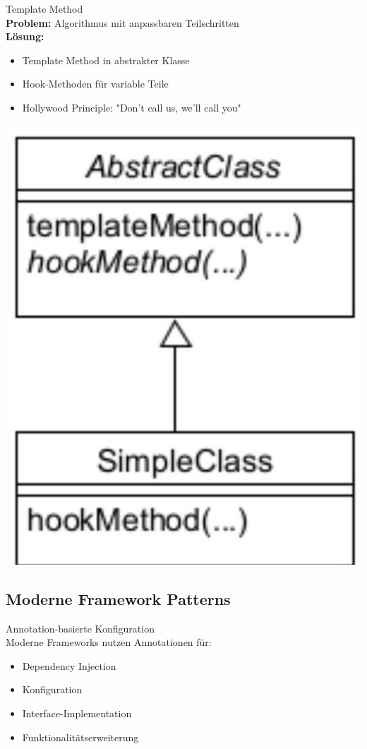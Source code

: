 \begin{concept}{Template Method}\\
\textbf{Problem:} Algorithmus mit anpassbaren Teilschritten\\
\textbf{Lösung:}
\begin{itemize}
    \item Template Method in abstrakter Klasse
    \item Hook-Methoden für variable Teile
    \item Hollywood Principle: "Don't call us, we'll call you"
\end{itemize}
\includegraphics[width=0.8\linewidth]{images/2025_01_02_73d93f10fa91ab6123dcg-22}
\end{concept}



\subsection{Moderne Framework Patterns}

\begin{concept}{Annotation-basierte Konfiguration}\\
Moderne Frameworks nutzen Annotationen für:
\begin{itemize}
    \item Dependency Injection
    \item Konfiguration
    \item Interface-Implementation
    \item Funktionalitätserweiterung
\end{itemize}
\end{concept}

